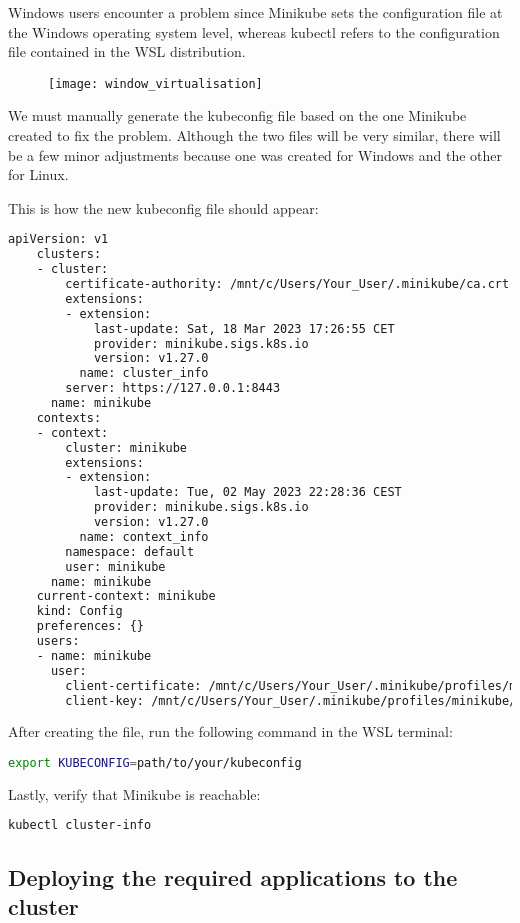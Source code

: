 Windows users encounter a problem since Minikube sets the configuration file at the Windows operating system level, whereas kubectl refers to the configuration file contained in the WSL distribution.

\begin{figure}[H]
	\centering
	\texttt{[image: window\_virtualisation]}
	\label{fig:window_virtualisation}
\end{figure}

We must manually generate the kubeconfig file based on the one Minikube created to fix the problem. Although the two files will be very similar, there will be a few minor adjustments because one was created for Windows and the other for Linux.

This is how the new kubeconfig file should appear:

\begin{lstlisting}[language=bash]
	apiVersion: v1
	clusters:
	- cluster:
		certificate-authority: /mnt/c/Users/Your_User/.minikube/ca.crt
		extensions:
		- extension:
			last-update: Sat, 18 Mar 2023 17:26:55 CET
			provider: minikube.sigs.k8s.io
			version: v1.27.0
		  name: cluster_info
		server: https://127.0.0.1:8443
	  name: minikube
	contexts:
	- context:
		cluster: minikube
		extensions:
		- extension:
			last-update: Tue, 02 May 2023 22:28:36 CEST
			provider: minikube.sigs.k8s.io
			version: v1.27.0
		  name: context_info
		namespace: default
		user: minikube
	  name: minikube
	current-context: minikube
	kind: Config
	preferences: {}
	users:
	- name: minikube
	  user:
		client-certificate: /mnt/c/Users/Your_User/.minikube/profiles/minikube/client.crt
		client-key: /mnt/c/Users/Your_User/.minikube/profiles/minikube/client.key
\end{lstlisting}

After creating the file, run the following command in the WSL terminal:
\begin{lstlisting}[language=bash]
	export KUBECONFIG=path/to/your/kubeconfig
\end{lstlisting}

Lastly, verify that Minikube is reachable:
\begin{lstlisting}[language=bash]
	kubectl cluster-info
\end{lstlisting}

\subsection{Deploying the required applications to the cluster}

